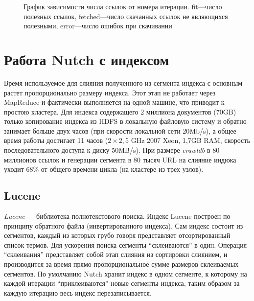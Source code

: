 \begin{figure}[h!]
 \caption{График зависимости числа ссылок от номера итерации. fit---число полезных ссылок, fetched---число скачанных ссылок не являющихся полезными, error---число ошибок при скачивании}
 \label{ris:score}
\end{figure}

\section{Работа Nutch с индексом}
Время используемое для слияния полученного из сегмента индекса с основным растет пропорционально размеру индекса. Этот этап не работает через MapReduce и фактически выполняется на одной машине, что приводит к простою кластера. Для индекса содержащего 2 миллиона документов (70GB) только копирование индекса из HDFS в локальную файловую систему и обратно занимает больше двух часов (при скорости локальной сети 20Mb/s), а общее время работы достигает 11 часов ($2\times2,5$ GHz 2007 Xeon, 1,7GB RAM, скорость последовательного доступа к диску 50MB/s). При размере \textit{crawldb} в 80 миллионов ссылок и генерации сегмента в 80 тысяч URL на слияние индюка уходит 68\% от общего времени цикла (на кластере из трех узлов).
\subsection{Lucene}
\textit{Lucene} --- библиотека полнотекстового поиска. Индекс Lucene построен по принципу обратного файла (инвертированного индекса). Сам индекс состоит из сегментов, каждый из которых грубо говоря представляет отсортированный список термов. Для ускорения поиска сегменты ``склеиваются'' в один. Операция ``склеивания'' представляет собой этап слияния из сортировки слиянием, и производится за время прямо пропорциональное сумме размеров склеиваемых сегментов. По умолчанию Nutch хранит индекс в одном сегменте, к которому на каждой итерации ``приклеиваются'' новые сегменты индекса, таким образом за каждую итерацию весь индекс перезаписывается.

